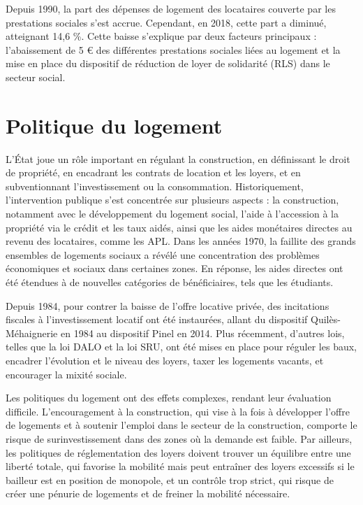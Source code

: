 \documentclass[a4paper, 12pt]{report}
\begin{document}
Depuis 1990, la part des dépenses de logement des locataires couverte par les prestations sociales s'est accrue. Cependant, en 2018, cette part a diminué, atteignant 14,6 \%. Cette baisse s'explique par deux facteurs principaux : l'abaissement de 5 € des différentes prestations sociales liées au logement et la mise en place du dispositif de réduction de loyer de solidarité (RLS) dans le secteur social.

\section{Politique du logement}

L'État joue un rôle important en régulant la construction, en définissant le droit de propriété, en encadrant les contrats de location et les loyers, et en subventionnant l'investissement ou la consommation. Historiquement, l'intervention publique s'est concentrée sur plusieurs aspects : la construction, notamment avec le développement du logement social, l'aide à l'accession à la propriété via le crédit et les taux aidés, ainsi que les aides monétaires directes au revenu des locataires, comme les APL. Dans les années 1970, la faillite des grands ensembles de logements sociaux a révélé une concentration des problèmes économiques et sociaux dans certaines zones. En réponse, les aides directes ont été étendues à de nouvelles catégories de bénéficiaires, tels que les étudiants.

Depuis 1984, pour contrer la baisse de l’offre locative privée, des incitations fiscales à l’investissement locatif ont été instaurées, allant du dispositif Quilès-Méhaignerie en 1984 au dispositif Pinel en 2014. Plus récemment, d’autres lois, telles que la loi DALO et la loi SRU, ont été mises en place pour réguler les baux, encadrer l’évolution et le niveau des loyers, taxer les logements vacants, et encourager la mixité sociale.

Les politiques du logement ont des effets complexes, rendant leur évaluation difficile. L’encouragement à la construction, qui vise à la fois à développer l’offre de logements et à soutenir l’emploi dans le secteur de la construction, comporte le risque de surinvestissement dans des zones où la demande est faible. Par ailleurs, les politiques de réglementation des loyers doivent trouver un équilibre entre une liberté totale, qui favorise la mobilité mais peut entraîner des loyers excessifs si le bailleur est en position de monopole, et un contrôle trop strict, qui risque de créer une pénurie de logements et de freiner la mobilité nécessaire.
\end{document}
